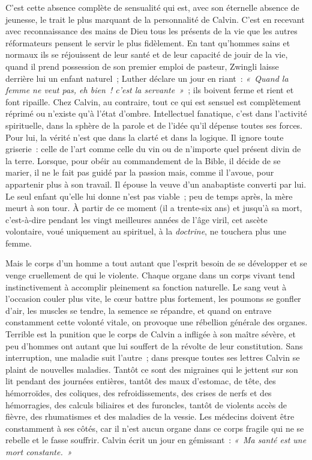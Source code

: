 \documentclass[french,twoside]{book} %
\begin{document}
C’est cette absence complète de sensualité qui est, avec son éternelle absence de jeunesse, le trait le plus marquant de la personnalité de Calvin. C’est en recevant avec reconnaissance des mains de Dieu tous les présents de la vie que les autres réformateurs pensent le servir le plus fidèlement. En tant qu’hommes sains et normaux ils se réjouissent de leur santé et de leur capacité de jouir de la vie, quand il prend possession de son premier emploi de pasteur, Zwingli laisse derrière lui un enfant naturel ; Luther déclare un jour en riant : \emph{« Quand la femme ne veut pas, eh bien ! c’est la servante »} ; ils boivent ferme et rient et font ripaille. Chez Calvin, au contraire, tout ce qui est sensuel est complètement réprimé ou n’existe qu’à l’état d’ombre. Intellectuel fanatique, c’est dans l’activité spirituelle, dans la sphère de la parole et de l’idée qu’il dépense toutes ses forces. Pour lui, la vérité n’est que dans la clarté et dans la logique. Il ignore toute griserie : celle de l’art comme celle du vin ou de n’importe quel présent divin de la terre. Lorsque, pour obéir au commandement de la Bible, il décide de se marier, il ne le fait pas guidé par la passion mais, comme il l’avoue, pour appartenir plus à son travail. Il épouse la veuve d’un anabaptiste converti par lui. Le seul enfant qu’elle lui donne n’est pas viable ; peu de temps après, la mère meurt à son tour. À partir de ce moment (il a trente-six ans) et jusqu’à sa mort, c’est-à-dire pendant les vingt meilleures années de l’âge viril, cet ascète volontaire, voué uniquement au spirituel, à la \emph{doctrine}, ne touchera plus une femme.\par
Mais le corps d’un homme a tout autant que l’esprit besoin de se développer et se venge cruellement de qui le violente. Chaque organe dans un corps vivant tend instinctivement à accomplir pleinement sa fonction naturelle. Le sang veut à l’occasion couler plus vite, le cœur battre plus fortement, les poumons se gonfler d’air, les muscles se tendre, la semence se répandre, et quand on entrave constamment cette volonté vitale, on provoque une rébellion générale des organes. Terrible est la punition que le corps de Calvin a infligée à son maître sévère, et peu d’hommes ont autant que lui souffert de la révolte de leur constitution. Sans interruption, une maladie suit l’autre ; dans presque toutes ses lettres Calvin se plaint de nouvelles maladies. Tantôt ce sont des migraines qui le jettent sur son lit pendant des journées entières, tantôt des maux d’estomac, de tête, des hémorroïdes, des coliques, des refroidissements, des crises de nerfs et des hémorragies, des calculs biliaires et des furoncles, tantôt de violents accès de fièvre, des rhumatismes et des maladies de la vessie. Les médecins doivent être constamment à ses côtés, car il n’est aucun organe dans ce corps fragile qui ne se rebelle et le fasse souffrir. Calvin écrit un jour en gémissant : \emph{« Ma santé est une mort constante. »}\par
\end{document}
